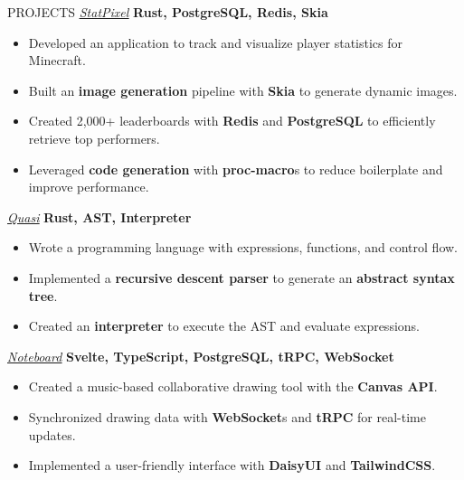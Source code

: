 \documentclass{resume}
\begin{document}
\begin{rSection}{PROJECTS}
	\href{https://github.com/statpixel-rs/statpixel}{\underline{\textit{StatPixel}}} \textbf{Rust, PostgreSQL, Redis, Skia}
	\vspace{-8pt}
	\begin{itemize}
		\itemsep -6pt {}
		\item Developed an application to track and visualize player statistics for Minecraft.
		\item Built an \textbf{image generation} pipeline with \textbf{Skia} to generate dynamic images.
		\item Created 2,000+ leaderboards with \textbf{Redis} and \textbf{PostgreSQL} to efficiently retrieve top performers.
		\item Leveraged \textbf{code generation} with \textbf{proc-macro}s to reduce boilerplate and improve performance.
	\end{itemize}

	\vspace{-4pt}

	\href{https://github.com/matteopolak/quasi}{\underline{\textit{Quasi}}} \textbf{Rust, AST, Interpreter}
	\vspace{-8pt}
	\begin{itemize}
		\itemsep -6pt {}
		\item Wrote a programming language with expressions, functions, and control flow.
		\item Implemented a \textbf{recursive descent parser} to generate an \textbf{abstract syntax tree}.
		\item Created an \textbf{interpreter} to execute the AST and evaluate expressions.
	\end{itemize}

	\vspace{-4pt}

	\href{https://github.com/matteopolak/noteboard}{\underline{\textit{Noteboard}}} \textbf{Svelte, TypeScript, PostgreSQL, tRPC, WebSocket}
	\vspace{-8pt}
	\begin{itemize}
		\itemsep -6pt {}
		\item Created a music-based collaborative drawing tool with the \textbf{Canvas API}.
		\item Synchronized drawing data with \textbf{WebSocket}s and \textbf{tRPC} for real-time updates.
		\item Implemented a user-friendly interface with \textbf{DaisyUI} and \textbf{TailwindCSS}.
	\end{itemize}
\end{rSection}
\end{document}
